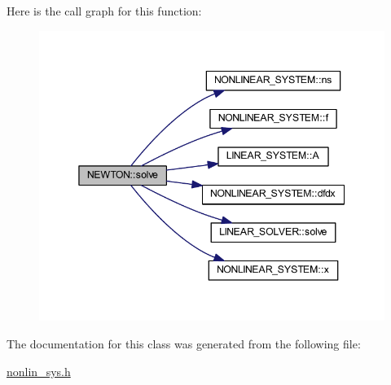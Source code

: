 Here is the call graph for this function\+:
\nopagebreak
\begin{figure}[H]
\begin{center}
\leavevmode
\includegraphics[width=345pt]{class_n_e_w_t_o_n_a1dd31b882567d3e0427eb53ce169f0ce_cgraph}
\end{center}
\end{figure}


The documentation for this class was generated from the following file\+:\begin{DoxyCompactItemize}
\item 
\mbox{\hyperlink{nonlin__sys_8h}{nonlin\+\_\+sys.\+h}}\end{DoxyCompactItemize}
